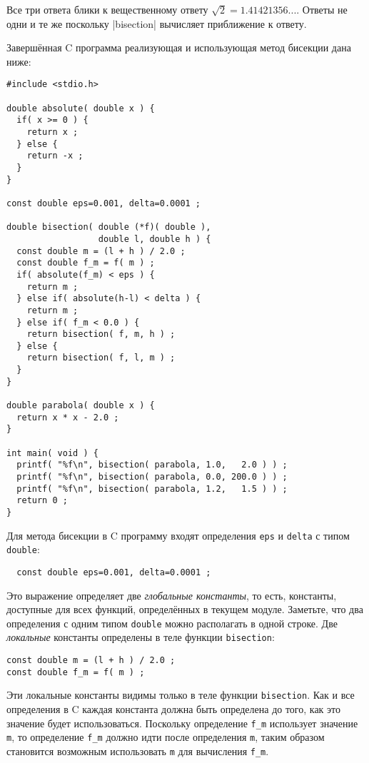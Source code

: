 Все три ответа блики к вещественному ответу $\sqrt{2} = 1.41421356...$. Ответы не одни и те же поскольку \inline|bisection| вычисляет приближение к ответу.

Завершённая C программа реализующая и использующая метод бисекции дана ниже:

\begin{lstlisting}
#include <stdio.h>

double absolute( double x ) {
  if( x >= 0 ) {
    return x ;
  } else {
    return -x ;
  }
}

const double eps=0.001, delta=0.0001 ;

double bisection( double (*f)( double ),
                  double l, double h ) {
  const double m = (l + h ) / 2.0 ;
  const double f_m = f( m ) ;
  if( absolute(f_m) < eps ) {
    return m ;
  } else if( absolute(h-l) < delta ) {
    return m ;
  } else if( f_m < 0.0 ) {
    return bisection( f, m, h ) ;
  } else {
    return bisection( f, l, m ) ;
  }
}

double parabola( double x ) {
  return x * x - 2.0 ;
}

int main( void ) {
  printf( "%f\n", bisection( parabola, 1.0,   2.0 ) ) ;
  printf( "%f\n", bisection( parabola, 0.0, 200.0 ) ) ;
  printf( "%f\n", bisection( parabola, 1.2,   1.5 ) ) ;
  return 0 ;
}
\end{lstlisting}

Для метода бисекции в C программу входят определения \lstinline|eps| и \lstinline|delta| с типом \lstinline|double|:

\begin{lstlisting}
  const double eps=0.001, delta=0.0001 ;
\end{lstlisting}

Это выражение определяет две \emph{глобальные константы}, то есть, константы, доступные для всех функций, определённых в текущем модуле. Заметьте, что два определения с одним типом \lstinline|double| можно располагать в одной строке. Две \emph{локальные} константы определены в теле функции \lstinline|bisection|:

\begin{lstlisting}
const double m = (l + h ) / 2.0 ;
const double f_m = f( m ) ;
\end{lstlisting}

Эти локальные константы видимы только в теле функции \lstinline|bisection|. Как и все определения в C каждая константа должна быть определена до того, как это значение будет использоваться. Поскольку определение \lstinline|f_m| использует значение \lstinline|m|, то определение \lstinline|f_m| должно идти после определения \lstinline|m|, таким образом становится возможным использовать \lstinline|m| для вычисления \lstinline|f_m|.


